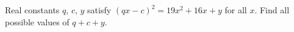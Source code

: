 Real constants $q$, $c$, $y$ satisfy $(qx-c)^2=19x^2+16x+y$ for all $x$. Find all possible values of $q+c+y$.
